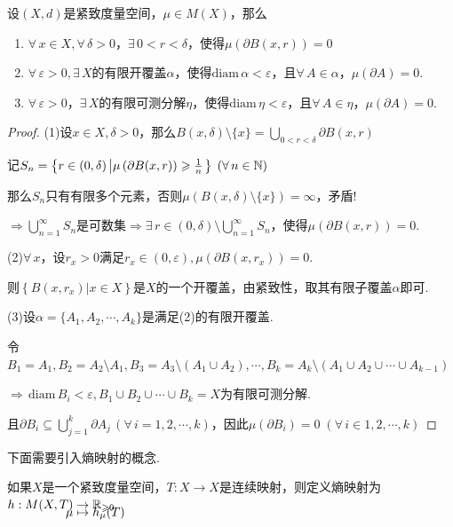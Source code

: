 \begin{theorem}{}
    设$(X,d)$是紧致度量空间，$\mu\in M(X)$，那么
    \begin{enumerate}[(1)]
        \item $\forall\, x\in X,\forall\,\delta>0$，$\exists\, 0<r<\delta$，使得$\mu\left(\partial B(x,r)\right)=0$
        \item $\forall\,\varepsilon>0,\exists\,X$的有限开覆盖$\alpha$，使得$\mathrm{diam}\,\alpha<\varepsilon$，且$\forall\, A\in\alpha$，$\mu(\partial A)=0$.
        \item $\forall\,\varepsilon>0$，$\exists\,X$的有限可测分解$\eta$，使得$\mathrm{diam}\,\eta<\varepsilon$，且$\forall\, A\in\eta$，$\mu(\partial A)=0$.
    \end{enumerate}
\end{theorem}
\begin{proof}
    (1)设$x\in X,\delta>0$，那么$B(x,\delta)\setminus\{x\}=\bigcup_{0<r<\delta}\partial B(x,r)$\par
    记$S_n=\left\{r\in(0,\delta)\left|\mu\left(\partial B(x,r)\right)\geqslant\frac{1}{n}\right.\right\}\;(\forall\, n\in\mathbb{N})$\par
    那么$S_n$只有有限多个元素，否则$\mu\left(B(x,\delta)\setminus\{x\}\right)=\infty$，矛盾! \par
    $\Rightarrow \bigcup_{n=1}^\infty S_n$是可数集$\Rightarrow\exists\, r\in(0,\delta)\setminus\bigcup_{n=1}^\infty{S_n}$，使得$\mu\left(\partial B(x,r)\right)=0$.\par
    (2)$\forall\, x$，设$r_x>0$满足$r_x\in (0,\varepsilon),\mu\left(\partial B(x,r_x)\right)=0$.\par
    则$\left\{B(x,r_x)|x\in X\right\}$是$X$的一个开覆盖，由紧致性，取其有限子覆盖$\alpha$即可.\par
    (3)设$\alpha=\{A_1,A_2,\cdots,A_k\}$是满足(2)的有限开覆盖.\par
    令$B_1=A_1,B_2=A_2\setminus A_1,B_3=A_3\setminus(A_1\cup A_2),\cdots,B_k=A_k\setminus(A_1\cup A_2\cup\cdots\cup A_{k-1})$\par
    $\Rightarrow\,\mathrm{diam}\,B_i<\varepsilon,B_1\cup B_2\cup\cdots\cup B_k=X$为有限可测分解.\par
    且$\partial B_i\subseteq\bigcup_{j=1}^k{\partial A_j}\,(\forall\,i=1,2,\cdots,k)$，因此$\mu\left(\partial B_i\right)=0\;(\forall\,i\in 1,2,\cdots,k)$
\end{proof}

下面需要引入熵映射的概念.\par
如果$X$是一个紧致度量空间，$T:X\to X$是连续映射，则定义熵映射为$\setjot[-6]\begin{aligned}[t]
    h:M(X,T) &\to \mb{R}_{\geq 0} \\
    \mu &\mapsto h_\mu(T)
\end{aligned}$

